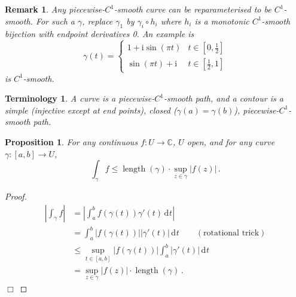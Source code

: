 \documentclass{article}
\theoremstyle{plain}\theoremheaderfont{\normalfont\itshape}\theorembodyfont{\rmfamily}\theoremseparator{.}\newtheorem*{rem}{Remark}\newtheorem*{ex}{Example}\newtheorem*{proof}{Proof}\newtheorem*{altp}{Alternative proof}\newtheorem*{con}{Consequences}\newtheorem*{notn}{Notations}\newtheorem*{cau}{Caution}\newtheorem*{term}{Terminology}\newtheorem*{keyex}{Key example}
\theoremstyle{plain}\theoremheaderfont{\normalfont\bfseries}\theorembodyfont{\rmfamily}\theoremseparator{.}\newtheorem{thm}{Theorem}[section]\newtheorem{lem}[thm]{Lemma}\newtheorem{prop}[thm]{Proposition}\newtheorem*{cor}{Corollary}\newtheorem{defn}[thm]{Definition}\newtheorem{clm}[thm]{Claim}\newtheorem{clminproof}{Claim}\newtheorem{leminproof}{Lemma}\newtheorem{app}{Application}
\theoremstyle{break}\theoremheaderfont{\normalfont\itshape}\theorembodyfont{\rmfamily}\theoremseparator{.\medskip}\newtheorem*{proofskip}{Proof}\newtheorem*{exs}{Examples}\newtheorem*{rems}{Remarks}\newtheorem*{rec}{Recall}\newtheorem*{ppts}{Properties}
\theoremstyle{break}\theoremheaderfont{\normalfont\bfseries}\theorembodyfont{\rmfamily}\theoremseparator{.\medskip}\newtheorem{lemskip}[thm]{Lemma}\newtheorem{defnskip}[thm]{Definition}\newtheorem{propskip}[thm]{Proposition}\newtheorem{thmskip}[thm]{Theorem}
\numberwithin{equation}{section}
\newcommand{\ii}{\mathrm{i}}
\DeclareMathOperator*{\length}{length}
\newcommand{\qed}{\hfill\ensuremath{\Box}}
\newcommand{\abs}[1]{\left|#1\right|}
\newcommand{\dd}[2][]{\,\mathrm{d}^{#1} #2}
\newcommand{\CC}{\mathbb{C}}
\begin{document}
    \begin{rem}
        Any piecewise-\(C^1\)-smooth curve can be reparameterised to be \(C^1\)-smooth. For such a \(\gamma\), replace \(\gamma_1\) by \(\gamma_i\circ h_i\) where \(h_i\) is a monotonic \(C^1\)-smooth bijection with endpoint derivatives 0. An example is
        \[\gamma(t)=\begin{cases}
            1+\ii\sin(\pi t) &t\in[0,\frac{1}{2}]\\
            \sin(\pi t)+\ii & t\in[\frac{1}{2},1] 
        \end{cases}\]
        is \(C^1\)-smooth.
        \begin{figure}[ht!]
            \centering
        \end{figure}
    \end{rem}
    \begin{term}
        A \textit{curve} is a piecewise-\(C^1\)-smooth path, and a \textit{contour} is a simple (injective except at end points), closed (\(\gamma(a)=\gamma(b)\)), piecewise-\(C^1\)-smooth path.
    \end{term}
    \begin{prop}
        For any continuous \(f:U\to\CC\), \(U\) open, and for any curve \(\gamma:[a,b]\to U\),
        \[\int_\gamma f\le\length(\gamma)\cdot\sup_{z\in\gamma}\abs{f(z)}\,.\]
    \end{prop}
    \begin{proof}
        \begin{align*}
            \abs{\int_\gamma f}&=\abs{\int_{a}^{b}f(\gamma(t))\gamma'(t)\dd{t}}\\
            &=\int_{a}^{b}\abs{f(\gamma(t))}\abs{\gamma'(t)}\dd{t}\qquad(\text{rotational trick})\\
            &\le\sup_{t\in[a,b]}\abs{f(\gamma(t))}\int_{a}^{b}\abs{\gamma'(t)}\dd{t}\\
            &=\sup_{z\in\gamma}\abs{f(z)}\cdot\length(\gamma)\,.
        \end{align*}\qed
    \end{proof}
\end{document}
